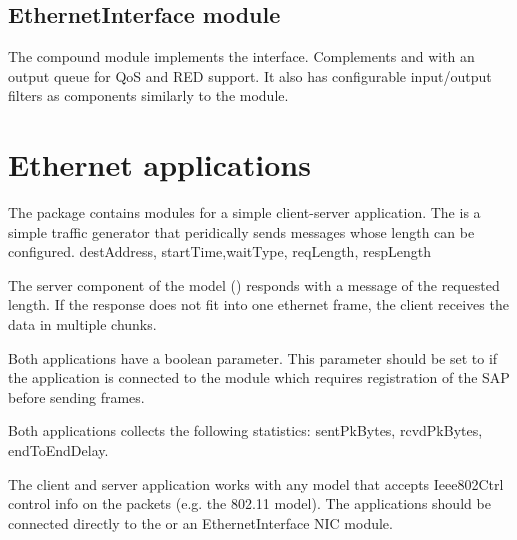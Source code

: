 \subsection{EthernetInterface module}

The  compound module implements the 
interface. Complements  and  with an output queue
for QoS and RED support. It also has configurable input/output filters as 
components similarly to the  module.


\section{Ethernet applications}

The  package contains modules
for a simple client-server application. The  is a simple
traffic generator that peridically sends  messages
whose length can be configured. destAddress, startTime,waitType, reqLength, respLength

The server component of the model () responds with a
 message of the requested length. If the response does
not fit into one ethernet frame, the client receives the data in multiple
chunks.


Both applications have a  boolean parameter.
This parameter should be set to  if the application is connected
to the  module which requires registration of the SAP
before sending frames.

Both applications collects the following statistics: sentPkBytes, rcvdPkBytes,
endToEndDelay.

The client and server application works with any model that accepts
Ieee802Ctrl control info on the packets (e.g. the 802.11 model).
The applications should be connected directly to the 
or an EthernetInterface NIC module.

